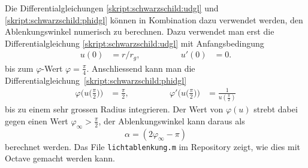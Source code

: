 Die Differentialgleichungen
\eqref{skript:schwarzschild:udgl}
und
\eqref{skript:schwarzschild:phidgl}
können in Kombination dazu verwendet werden, den Ablenkungswinkel
numerisch zu berechnen.
Dazu verwendet man erst die Differentialgleichung
\eqref{skript:schwarzschild:udgl}
mit Anfangsbedingung
\begin{equation*}
\begin{aligned}
u(0)&=r/r_g,
\qquad&\qquad
u'(0)&=0.
\end{aligned}
\end{equation*}
bis zum $\varphi$-Wert $\varphi=\frac{\pi}4$.
Anschliessend kann man die
Differentialgleichung~\eqref{skript:schwarzschild:phidgl}
\begin{equation*}
\begin{aligned}
\varphi\biggl(u\biggl(\frac{\pi}2\biggr)\biggr)&=\frac{\pi}2,
\qquad&\qquad
\varphi'\biggl(u\biggl(\frac{\pi}2\biggr)\biggr)&=\frac1{u(\frac{\pi}2)}
\end{aligned}
\end{equation*}
bis zu einem sehr grossen Radius integrieren. 
Der Wert von $\varphi(u)$ strebt dabei gegen einen Wert
$\varphi_\infty>\frac{\pi}2$, der Ablenkungswinkel kann daraus als
\[
\alpha
=
(2\varphi_\infty - \pi)
\]
berechnet werden.
Das File \texttt{lichtablenkung.m} im Repository zeigt, wie dies mit
Octave gemacht werden kann.

